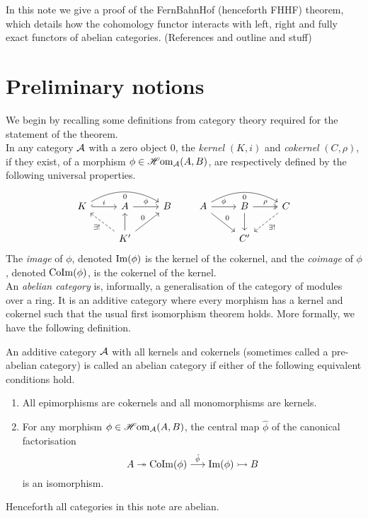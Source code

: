 \documentclass[a4paper]{article}
\def\mono{\rightarrowtail}
\def\epi{\twoheadrightarrow}
\begin{document}
\maketitle
In this note we give a proof of the FernBahnHof (henceforth FHHF) theorem, which details how the cohomology functor interacts with left, right and fully exact functors of abelian categories. (References and outline and stuff)
\section{Preliminary notions}
We begin by recalling some definitions from category theory required for the statement of the theorem.\\
In any category $\mathcal{A}$ with a zero object $0$, the \emph{kernel} $(K,i)$ and \emph{cokernel} $(C,\rho)$, if they exist, of a morphism $\phi \in \operatorname{\mathscr{H}om}_{\mathcal{A}}(A,B)$, are respectively defined by the following universal properties.
\[
    \begin{tikzcd}
        K \arrow[r, "i", hook] \arrow[rr, "0"', bend left]& A \arrow[r, "\phi"] & B \\
        & K' \arrow[lu, "\exists!", dashed] \arrow[u] \arrow[ur, "0"] &
    \end{tikzcd}
    \qquad
    \begin{tikzcd}
        A \arrow[r, "\phi"] \arrow[rr, "0"', bend left] \arrow[rd, "0"]& B \arrow[d] \arrow[r, "\rho", two heads] & C \arrow[ld, "\exists!", dashed]\\
        & C' &
    \end{tikzcd}
\]
The \emph{image} of $\phi$, denoted $\operatorname{Im}(\phi)$ is the kernel of the cokernel, and the \emph{coimage} of $\phi$, denoted $\operatorname{CoIm}(\phi)$, is the cokernel of the kernel.\\


An \emph{abelian category} is, informally, a generalisation of the category of modules over a ring. It is an additive category where every morphism has a kernel and cokernel such that the usual first isomorphism theorem holds. More formally, we have the following definition.
\begin{Definition}
    An additive category $\mathcal{A}$ with all kernels and cokernels (sometimes called a pre-abelian category) is called an abelian category if either of the following equivalent conditions hold.
    \begin{enumerate}
        \item All epimorphisms are cokernels and all monomorphisms are kernels.
        \item For any morphism $\phi\in \operatorname{\mathscr{H}om}_{\mathcal{A}}(A,B)$, the central map $\hat{\phi}$ of the canonical factorisation
            \[
                A \epi \CoIm(\phi) \stackrel{\hat{\phi}}{\to} \im(\phi) \mono B
            \]
            is an isomorphism.
    \end{enumerate}
\end{Definition}
Henceforth all categories in this note are abelian.\\
\end{document}
